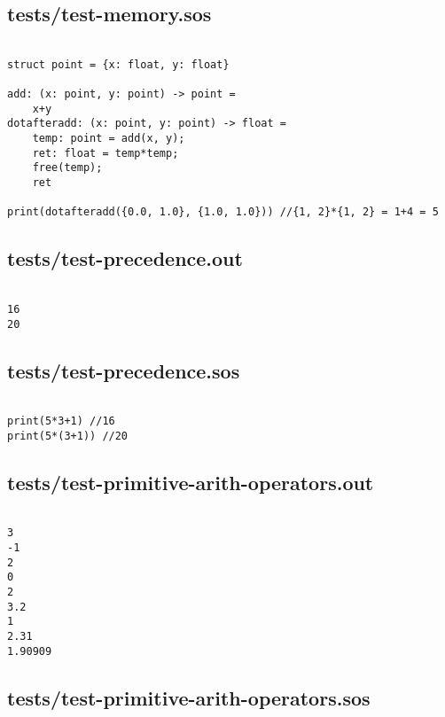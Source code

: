 \documentclass[main.tex]{subfiles}
\begin{document}
\subsection{tests/test-memory.sos}

\begin{lstlisting}

struct point = {x: float, y: float}

add: (x: point, y: point) -> point = 
    x+y
dotafteradd: (x: point, y: point) -> float =
    temp: point = add(x, y);
    ret: float = temp*temp;
    free(temp);
    ret

print(dotafteradd({0.0, 1.0}, {1.0, 1.0})) //{1, 2}*{1, 2} = 1+4 = 5
\end{lstlisting}

\subsection{tests/test-precedence.out}

\begin{lstlisting}

16
20
\end{lstlisting}

\subsection{tests/test-precedence.sos}

\begin{lstlisting}

print(5*3+1) //16
print(5*(3+1)) //20
\end{lstlisting}

\subsection{tests/test-primitive-arith-operators.out}

\begin{lstlisting}

3
-1
2
0
2
3.2
1
2.31
1.90909
\end{lstlisting}

\subsection{tests/test-primitive-arith-operators.sos}
\end{document}
